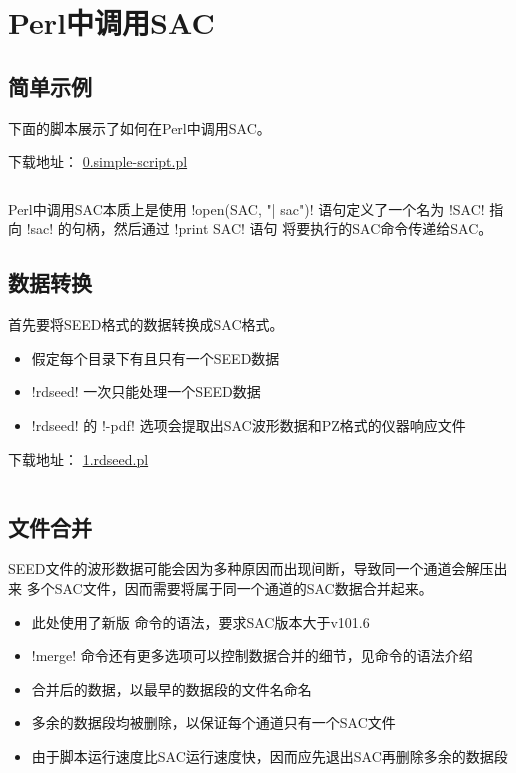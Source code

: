 \section{Perl中调用SAC}
\label{sec:sac-perl}

\subsection{简单示例}
下面的脚本展示了如何在Perl中调用SAC。

下载地址： \href{https://raw.githubusercontent.com/seisman/SAC_Docs_zh/master/call-in-script/0.simple-script.pl}{0.simple-script.pl}
\inputminted{perl}{./call-in-script/0.simple-script.pl}
Perl中调用SAC本质上是使用 !open(SAC, "| sac")! 语句定义了一个名为
!SAC! 指向 !sac! 的句柄，然后通过 !print SAC! 语句
将要执行的SAC命令传递给SAC。

\subsection{数据转换}
首先要将SEED格式的数据转换成SAC格式。
\begin{itemize}
\item 假定每个目录下有且只有一个SEED数据
\item !rdseed! 一次只能处理一个SEED数据
\item !rdseed! 的 !-pdf! 选项会提取出SAC波形数据和PZ格式的仪器响应文件
\end{itemize}

下载地址： \href{https://raw.githubusercontent.com/seisman/SAC_Docs_zh/master/call-in-script/1.rdseed.pl}{1.rdseed.pl}
\inputminted{perl}{./call-in-script/1.rdseed.pl}

\subsection{文件合并}
\label{subsec:merge-in-perl}
SEED文件的波形数据可能会因为多种原因而出现间断，导致同一个通道会解压出来
多个SAC文件，因而需要将属于同一个通道的SAC数据合并起来。
\begin{itemize}
\item 此处使用了新版  命令的语法，要求SAC版本大于v101.6
\item !merge! 命令还有更多选项可以控制数据合并的细节，见命令的语法介绍
\item 合并后的数据，以最早的数据段的文件名命名
\item 多余的数据段均被删除，以保证每个通道只有一个SAC文件
\item 由于脚本运行速度比SAC运行速度快，因而应先退出SAC再删除多余的数据段
\end{itemize}

